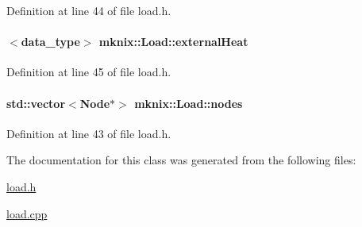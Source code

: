 Definition at line 44 of file load.\+h.

\hypertarget{classmknix_1_1_load_a6ef73045639703aac7cdebe3fedcc513}{}
\paragraph[{external\+Heat}]{$<${\bf data\+\_\+type}$>$ mknix\+::\+Load\+::external\+Heat\hspace{0.3cm}{\ttfamily [protected]}}\label{classmknix_1_1_load_a6ef73045639703aac7cdebe3fedcc513}


Definition at line 45 of file load.\+h.

\hypertarget{classmknix_1_1_load_a0cff22a8b9f289b38d978546160b6bb6}{}
\paragraph[{nodes}]{\setlength{\rightskip}{0pt plus 5cm}std\+::vector$<${\bf Node}$\ast$$>$ mknix\+::\+Load\+::nodes\hspace{0.3cm}{\ttfamily [protected]}}\label{classmknix_1_1_load_a0cff22a8b9f289b38d978546160b6bb6}


Definition at line 43 of file load.\+h.



The documentation for this class was generated from the following files\+:\begin{DoxyCompactItemize}
\item 
\hyperlink{load_8h}{load.\+h}\item 
\hyperlink{load_8cpp}{load.\+cpp}\end{DoxyCompactItemize}
